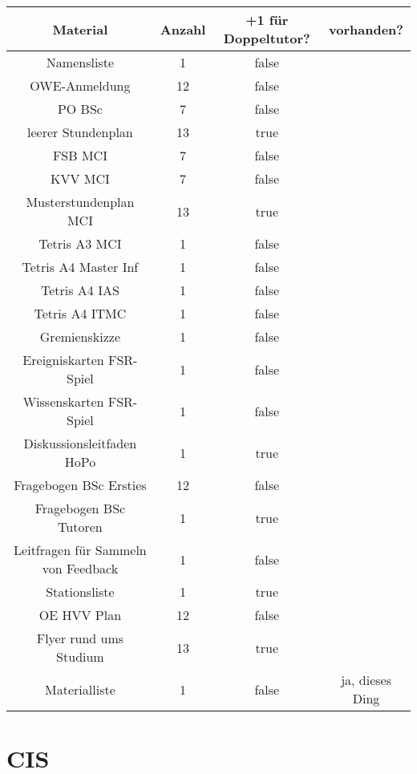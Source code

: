 \documentclass[10pt,a4paper,oneside,ngerman,numbers=noenddot]{scrartcl}
\begin{document}
	\begin{tabular}{c|c|c|c}
		\textbf{Material} & \textbf{Anzahl} & \textbf{+1 für Doppeltutor?} & \textbf{vorhanden?} \\
		\hline
		Namensliste & 1 & false & \\
		\hline
		OWE-Anmeldung & 12 & false & \\
		\hline
		PO BSc & 7 & false & \\
		\hline
		leerer Stundenplan & 13 & true & \\
		\hline
		FSB MCI & 7 & false & \\
		\hline
		KVV MCI & 7 & false & \\
		\hline
		Musterstundenplan MCI & 13 & true & \\
		\hline
		Tetris A3 MCI & 1 & false & \\
		\hline
		Tetris A4 Master Inf & 1 & false & \\
		\hline
		Tetris A4 IAS & 1 & false & \\
		\hline
		Tetris A4 ITMC & 1 & false & \\
		\hline
		Gremienskizze & 1 & false & \\
		\hline
		Ereigniskarten FSR-Spiel & 1 & false & \\
		\hline
		Wissenskarten FSR-Spiel & 1 & false & \\
		\hline
		Diskussionsleitfaden HoPo & 1 & true & \\
		\hline
		Fragebogen BSc Ersties & 12 & false & \\
		\hline
		Fragebogen BSc Tutoren & 1 & true & \\
		\hline
		Leitfragen für Sammeln von Feedback & 1 & false & \\
		\hline
		Stationsliste & 1 & true & \\
		\hline
		OE HVV Plan & 12 & false & \\
		\hline
		Flyer rund ums Studium & 13 & true & \\
		\hline
		Materialliste & 1 & false & ja, dieses Ding \\
	\end{tabular}

\section{CIS}
\end{document}
